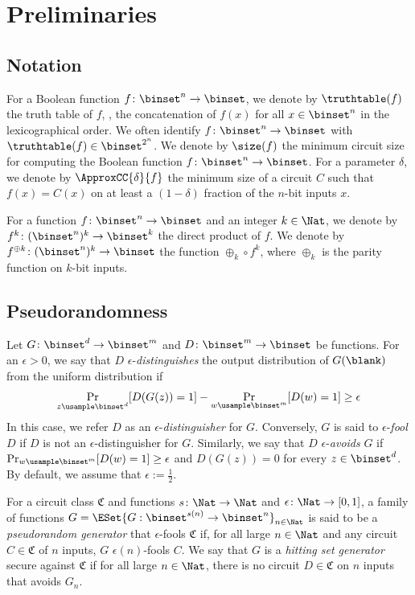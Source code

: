 \documentclass{toc}
\begin{document}
\section{Preliminaries}
\label{section_preliminaries}


\subsection{Notation}

For a Boolean function $f \colon \binset^n \to \binset$,
we denote by $\truthtable(f)$ the truth table of $f$, \ie, the concatenation of $f(x)$ for all $x \in \binset^n$ in the lexicographical order.
We often identify $f \colon \binset^n \to \binset$ with $\truthtable(f) \in \binset^{2^n}$.
We denote by $\size(f)$ the minimum circuit size for computing the Boolean function $f \colon \binset^n \to \binset$.
For a parameter $\delta$, we denote by $\ApproxCC{\delta}{f}$
the minimum size of a circuit $C$ such that $f(x) = C(x)$ on at least a $(1 - \delta)$ fraction of the $n$-bit inputs $x$.
%
%
%

%
%
%
%
%
%

For a function $f \colon \binset^n \to \binset$ and an integer $k \in \Nat$, we denote by $f^{k} \colon (\binset^n)^k \to \binset^k$
the direct product of $f$.
We denote by $f^{\oplus k} \colon (\binset^n)^k \to \binset$ the function $\oplus_k \circ f^{k}$, where $\oplus_k$ is the parity function on $k$-bit inputs.


\subsection{Pseudorandomness}
Let $G \colon \binset^d \to \binset^m$
and $D \colon \binset^m \to \binset$
be functions.
For an $\epsilon > 0$,
we say that $D$ $\epsilon$-\emph{distinguishes}
the output distribution of $G(\blank)$ from
the uniform distribution
if
$$
  \Pr_{z \usample \binset^d} [ D(G(z)) = 1 ]
  - \Pr_{w \usample \binset^m} [ D(w) = 1 ]
  \ge
  \epsilon
$$
In this case, we refer $D$ as an $\epsilon$-\emph{distinguisher} for $G$.
Conversely, $G$ is said to $\epsilon$-\emph{fool} $D$ if $D$ is not an $\epsilon$-distinguisher for $G$.
Similarly,
we say that $D$ $\epsilon$-\emph{avoids}
$G$
if
$\Pr_{w \usample \binset^m} [D(w) = 1] \ge \epsilon$
and
$D(G(z)) = 0$ for every $z \in \binset^d$.
By default, we assume that $\epsilon := \frac{1}{2}$.

For a circuit class $\mathfrak{C}$ and functions $s \colon \Nat \to \Nat$ and $\epsilon \colon \Nat \to [0,1]$,
a family of functions $G = \ESet{ G : \binset^{s(n)} \to \binset^n }_{n \in \Nat}$
is said to be a \emph{pseudorandom generator} that $\epsilon$-fools $\mathfrak{C}$
if,
for all large $n \in \Nat$ and any circuit $C \in \mathfrak{C}$ of $n$ inputs,
$G$ $\epsilon(n)$-fools $C$.
We say that $G$ is a \emph{hitting set generator} secure against $\mathfrak C$
if for all large $n \in \Nat$,
there is no circuit $D \in \mathfrak C$ on $n$ inputs
that avoids $G_n$.
\end{document}
